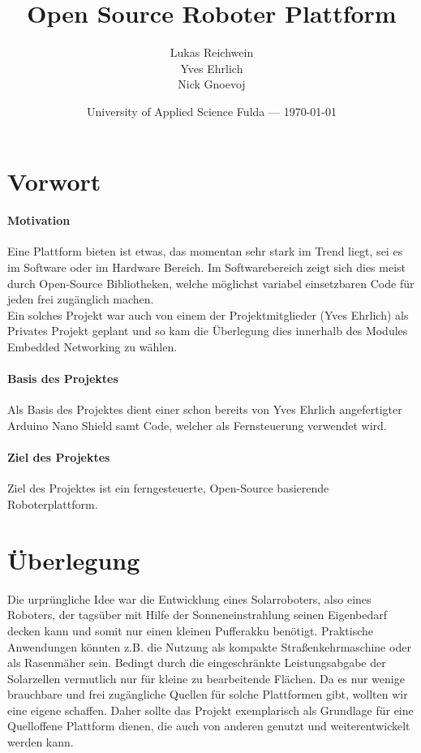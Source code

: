 \documentclass{article}
\title{Open Source Roboter Plattform} %
\author{Lukas Reichwein\\ Yves Ehrlich\\ Nick Gnoevoj}
\date{University of Applied Science Fulda --- \today} %
\begin{document}
\maketitle %
\tableofcontents %
\newpage


\section{Vorwort} %
    \paragraph{Motivation}
    Eine Plattform bieten ist etwas, das momentan sehr stark im Trend liegt, sei es im Software oder im Hardware Bereich. Im Softwarebereich zeigt sich dies meist durch Open-Source Bibliotheken, welche möglichst variabel einsetzbaren Code für jeden frei zugänglich machen. \\    
    Ein solches Projekt war auch von einem der Projektmitglieder (Yves Ehrlich) als Privates Projekt geplant und so kam die Überlegung dies innerhalb des Modules Embedded Networking zu wählen.\linebreak
    \paragraph{Basis des Projektes}
    Als Basis des Projektes dient einer schon bereits von Yves Ehrlich angefertigter Arduino Nano Shield samt Code,
    \cite{nanoGame} welcher als Fernsteuerung verwendet wird. 
    \paragraph{Ziel des Projektes}	
	Ziel des Projektes ist ein ferngesteuerte, Open-Source basierende Roboterplattform.

\newpage    
\section{Überlegung}%

Die urprüngliche Idee war die Entwicklung eines Solarroboters, also eines Roboters, der tagsüber mit Hilfe der Sonneneinstrahlung seinen Eigenbedarf decken kann und somit nur einen kleinen Pufferakku benötigt.
Praktische Anwendungen könnten z.B. die Nutzung als kompakte Straßenkehrmaschine oder als Rasenmäher sein. Bedingt durch die eingeschränkte Leistungsabgabe der Solarzellen vermutlich nur für kleine zu bearbeitende Flächen.
Da es nur wenige brauchbare und frei zugängliche Quellen für solche Plattformen gibt, wollten wir eine eigene schaffen. Daher sollte das Projekt exemplarisch als Grundlage für eine Quelloffene Plattform dienen, die auch von anderen genutzt und weiterentwickelt werden kann.
\end{document}

